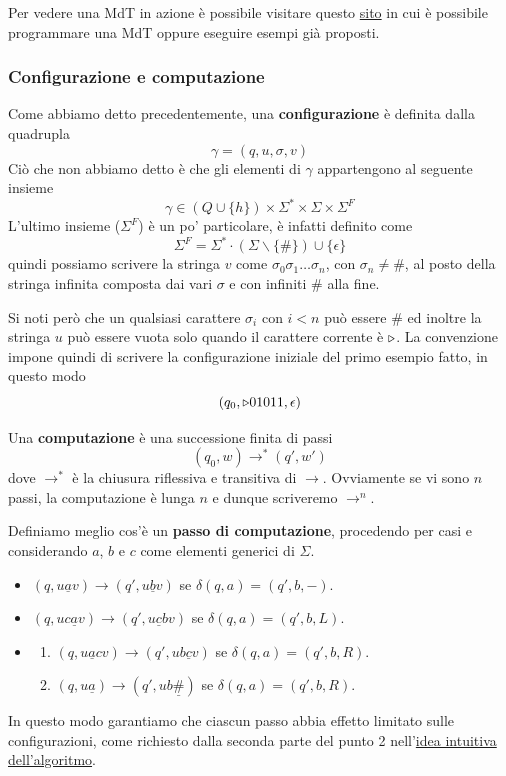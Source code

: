 Per vedere una MdT in azione è possibile visitare questo
\href{https://turingmachinesimulator.com/}{sito} in cui è
possibile programmare una MdT oppure eseguire esempi già
proposti.

\subsubsection{Configurazione e computazione}
Come abbiamo detto precedentemente, una \textbf{configurazione}
è definita dalla quadrupla
\[ \gamma = (q, u, \sigma, v) \]
Ciò che non abbiamo detto è che gli elementi di $\gamma$
appartengono al seguente insieme
\[
	\gamma \in (Q \cup \{ h \}) \times
	\Sigma^* \times \Sigma \times \Sigma^F
\]
L'ultimo insieme ($\Sigma^F$) è un po' particolare, è infatti
definito come
\[
	\Sigma^F = \Sigma^* \cdot \left( \Sigma \backslash
	\{ \# \} \right) \cup \{ \epsilon \}
\]
quindi possiamo scrivere la stringa $v$ come
$\sigma_0 \sigma_1 \dots \sigma_n$, con $\sigma_n \neq \#$,
al posto della stringa infinita composta dai vari $\sigma$ e
con infiniti $\#$ alla fine.

Si noti però che un qualsiasi carattere $\sigma_i$ con $i < n$
può essere $\#$ ed inoltre la stringa $u$ può essere vuota
solo quando il carattere corrente è $\triangleright$. La convenzione
impone quindi di scrivere la configurazione iniziale del primo
esempio fatto, in questo modo
\[ (q_0, \triangleright 01011, \epsilon) \]

\begin{definition}
	Una \textbf{computazione} è una successione finita di
	passi
	\[ (q_0, w) \to^* (q', w') \]
	dove $\to^*$ è la chiusura riflessiva e transitiva di
	$\to$. Ovviamente se vi sono $n$ passi, la computazione
	è lunga $n$ e dunque scriveremo $\to^n$.
\end{definition}

Definiamo meglio cos'è un \textbf{passo di computazione},
procedendo per casi e considerando $a$, $b$ e $c$ come elementi
generici di $\Sigma$.
\begin{itemize}
	\item $(q, u \underline{a} v) \to (q', u \underline{b} v)$
	      se $\delta (q, a) = (q', b, -)$.
	\item $(q, u c \underline{a} v) \to
		      (q', u \underline{c} b v)$
	      se $\delta (q, a) = (q', b, L)$.
	\item \begin{enumerate}
		      \item $(q, u \underline{a} c v) \to
			            (q', u b \underline{c} v)$
		            se $\delta (q, a) = (q', b, R)$.
		      \item $(q, u \underline{a}) \to
			            (q', u b \underline{\#})$
		            se $\delta (q, a) = (q', b, R)$.
	      \end{enumerate}
\end{itemize}
In questo modo garantiamo che ciascun passo abbia effetto
limitato sulle configurazioni, come richiesto dalla seconda
parte del punto 2 nell'\hyperref[sec: algoritmo]{idea intuitiva
	dell'algoritmo}.

